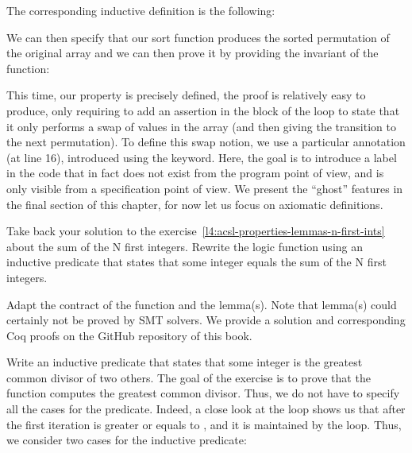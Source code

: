 The corresponding inductive definition is the following:




We can then specify that our sort function produces the sorted permutation of
the original array and we can then prove it by providing the invariant of the
function:





This time, our property is precisely defined, the proof is relatively easy to
produce, only requiring to add an assertion in the block of the loop to state
that it only performs a swap of values in the array (and then giving
the transition to the next permutation). To define this swap notion, we use
a particular annotation (at line 16), introduced using the 
keyword. Here, the goal is to introduce a label in the code that in
fact does not exist from the program point of view, and is only visible from
a specification point of view. We present the ``ghost'' features in the final
section of this chapter, for now let us focus on axiomatic definitions.







Take back your solution to the
exercise~\ref{l4:acsl-properties-lemmas-n-first-ints} about the sum of the N
first integers. Rewrite the logic function using an inductive predicate that
states that some integer equals the sum of the N first integers.




Adapt the contract of the function and the lemma(s). Note that lemma(s) could
certainly not be proved by SMT solvers. We provide a solution and corresponding
Coq proofs on the GitHub repository of this book.




Write an inductive predicate that states that some integer is the greatest common
divisor of two others. The goal of the exercise is to prove that the function
 computes the greatest common divisor. Thus, we do not have to
specify all the cases for the predicate. Indeed, a close look at the loop shows
us that after the first iteration  is greater or equals to
, and it is maintained by the loop. Thus, we consider two cases for
the inductive predicate:


